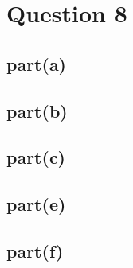\documentclass[a4paper]{article}
\begin{document}
\section*{Question 8}
\subsection*{part(a)}
\begin{stlog}\end{stlog}
\subsection*{part(b)}
\begin{stlog}\end{stlog}
\subsection*{part(c)}
\begin{stlog}\end{stlog}
\subsection*{part(e)}
\begin{stlog}\end{stlog}
\subsection*{part(f)}
\begin{stlog}\end{stlog}
\end{document}
